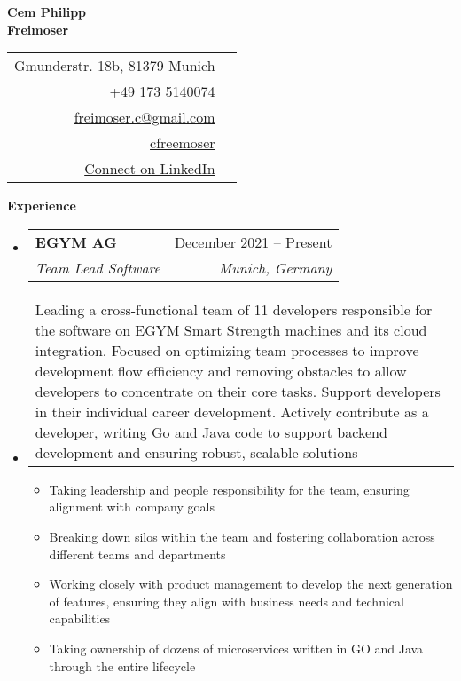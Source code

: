 \documentclass[letterpaper,12pt]{article}
\makeatletter
\def \firstname {Cem Philipp}
\def \lastname {Freimoser}
\def \linkedinicon {\faLinkedin}
\def \linkedintext {/dwight-schrute}
\def \homeicon {\faHome}
\def \hometext {Gmunderstr. 18b, 81379 Munich}
\def \phoneicon {\faPhone}
\def \phonetext {+49 173 5140074}
\def \emailicon {\faEnvelope}
\def \emaillink {mailto:freimoser.c@gmail.com}
\def \emailtext {freimoser.c@gmail.com}
\def \githubicon {\faGithub}
\def \githublink {https://github.com/cfreemoser}
\def \githubtext {cfreemoser}
\def \linkedinicon {\faLinkedin}
\def \linkedlink {https://www.linkedin.com/in/cem-philipp-freimoser-3b885011b/}
\def \linkedintext {Connect on LinkedIn}
\def \phone {\phonetext \hspace{3pt}\phoneicon}
\def \email {\href{\emaillink}{\emailtext} \hspace{3pt}\emailicon}
\def \github {\href{\githublink}{\githubtext} \hspace{3pt}\githubicon}
\def \home {\hometext \hspace{3pt}\homeicon}
\def \linkedin {\href{\linkedlink}{\linkedintext} \hspace{3pt}\linkedinicon}
\renewcommand{\section}[2]{\vspace{5pt}
  \colorbox{teriary}{\color{white}\raggedbottom\normalsize\textbf{{#1}{\hspace{7pt}#2}}}
}
\newcommand{\resumeEntryStart}{\vspace{0.5\baselineskip}\begin{minipage}{\textwidth}\begin{itemize}[leftmargin=2.5mm]}
\newcommand{\resumeEntryEnd}{\end{itemize}\end{minipage}\vspace{1\baselineskip}}
\newcommand{\resumeItemListStart}{\begin{itemize}[leftmargin=4.5mm]}
\newcommand{\resumeItemListEnd}{\end{itemize}}
\newcommand{\resumeItem}[1]{
  \item\small{
    {#1 \vspace{-2pt}}
  }
}
\newcommand{\resumeEntryTSDL}[4]{
  \vspace{-1pt}\item[]
    \begin{tabularx}{0.97\textwidth}{X@{\hspace{60pt}}r}
      \textbf{\color{primary}#1} & {\color{accent}\small#2} \\
      \textit{\color{accent}\small#3} & \textit{\color{accent}\small#4} \\
    \end{tabularx}\vspace{-6pt}
}
\newcommand{\resumeEntryDesc}[1]{
  \vspace{-1pt}\item[] 
  \small{
    \begin{tabularx}{0.97\textwidth}{X}
      #1
    \end{tabularx}
  }
  \vspace{-6pt}
}
\makeatother
\begin{document}

\vspace{1cm} 
\begin{multicols}{2}
  \vspace{2cm}
  \textbf{\fontsize{28}{36}\selectfont \firstname}\\
  \textbf{\fontsize{28}{36}\selectfont  \lastname}
  
  \columnbreak
  
  \vspace{2cm}
  \begin{flushright}
      \begin{tabular}{rl}
          \home \\
          \phone \\
          \email \\
          \github \\
          \linkedin \\
       \end{tabular}
  \end{flushright}
\end{multicols}
\vspace{1cm}

\section{\faBusinessTime}{Experience}

  \resumeEntryStart
    \resumeEntryTSDL
      {EGYM AG}{December 2021 -- Present}
      {Team Lead Software}{Munich, Germany}
    \resumeEntryDesc{Leading a cross-functional team of 11 developers responsible for the software on EGYM Smart Strength machines and its cloud integration. Focused on optimizing team processes to improve development flow efficiency and removing obstacles to allow developers to concentrate on their core tasks. Support developers in their individual career development. Actively contribute as a developer, writing Go and Java code to support backend development and ensuring robust, scalable solutions}
    \resumeItemListStart
    \resumeItem {Taking leadership and people responsibility for the team, ensuring alignment with company goals}
    \resumeItem {Breaking down silos within the team and fostering collaboration across different teams and departments}
    \resumeItem {Working closely with product management to develop the next generation of features, ensuring they align with business needs and technical capabilities}
    \resumeItem {Taking ownership of dozens of microservices written in GO and Java through the entire lifecycle}
    \resumeItemListEnd
  \resumeEntryEnd
\end{document}
